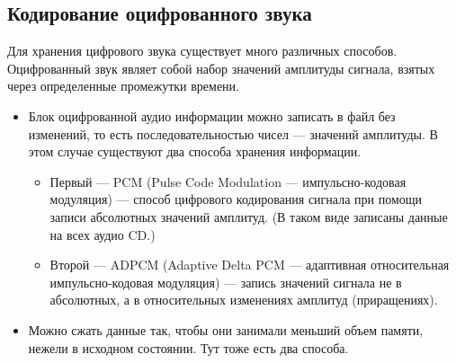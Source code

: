\documentclass[a4paper]{report}
\begin{document}
\subsection{Кодирование оцифрованного звука}
Для хранения цифрового звука существует много различных способов. Оцифрованный звук являет собой набор значений амплитуды сигнала, взятых через определенные промежутки времени.
\begin{itemize}
\item Блок оцифрованной аудио информации можно записать в файл без изменений, то есть последовательностью чисел — значений амплитуды. В этом случае существуют два способа хранения информации.
\begin{itemize}
\item Первый — PCM (Pulse Code Modulation — импульсно-кодовая модуляция) — способ цифрового кодирования сигнала при помощи записи абсолютных значений амплитуд. (В таком виде записаны данные на всех аудио CD.)
\item Второй — ADPCM (Adaptive Delta PCM — адаптивная относительная \\ импульсно-кодовая модуляция) — запись значений сигнала не в абсолютных, а в относительных изменениях амплитуд (приращениях).
\end{itemize}
\item Можно сжать данные так, чтобы они занимали меньший объем памяти, нежели в исходном состоянии. Тут тоже есть два способа.
\begin{itemize}



\end{itemize}
\end{itemize}
\end{document}

